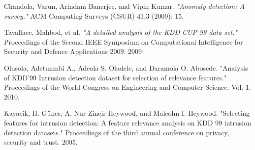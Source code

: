 \begin{thebibliography}{9}

Chandola, Varun, Arindam Banerjee, and Vipin Kumar. \emph{"Anomaly detection: A survey."} ACM Computing Surveys (CSUR) 41.3 (2009): 15.

Tavallaee, Mahbod, et al. \emph{"A detailed analysis of the KDD CUP 99 data set."} Proceedings of the Second IEEE Symposium on Computational Intelligence for Security and Defence Applications 2009. 2009

Olusola, Adetunmbi A., Adeola S. Oladele, and Daramola O. Abosede. "Analysis of KDD’99 Intrusion detection dataset for selection of relevance features." Proceedings of the World Congress on Engineering and Computer Science. Vol. 1. 2010.

Kayacik, H. Günes, A. Nur Zincir-Heywood, and Malcolm I. Heywood. "Selecting features for intrusion detection: A feature relevance analysis on KDD 99 intrusion detection datasets." Proceedings of the third annual conference on privacy, security and trust. 2005.

\end{thebibliography}
